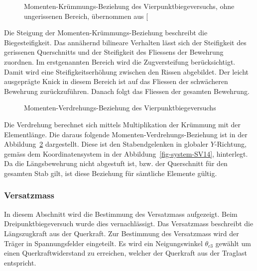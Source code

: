 \documentclass[
  11pt,
  letterpaper,
]{scrreprt}
\begin{document}
\begin{figure}[H]


\caption{\label{fig-mchi_sv14}Momenten-Krümmungs-Beziehung des
Vierpunktbiegeversuchs, ohne ungerissenen Bereich, übernommen aus
{[}\citeproc{ref-gitz_ansatze_2024}{1}{]}}

\end{figure}%

Die Steigung der Momenten-Krümmungs-Beziehung beschreibt die
Biegesteifigkeit. Das annähernd bilineare Verhalten lässt sich der
Steifigkeit des gerissenen Querschnitts und der Steifigkeit des
Fliessens der Bewehrung zuordnen. Im erstgenannten Bereich wird die
Zugversteifung berücksichtigt. Damit wird eine Steifigkeitserhöhung
zwischen den Rissen abgebildet. Der leicht ausgeprägte Knick in diesem
Bereich ist auf das Fliessen der schwächeren Bewehrung zurückzuführen.
Danach folgt das Fliessen der gesamten Bewehrung.

\begin{figure}[H]


\caption{\label{fig-mphi_sv14}Momenten-Verdrehungs-Beziehung des
Vierpunktbiegeversuchs}

\end{figure}%

Die Verdrehung berechnet sich mittels Multiplikation der Krümmung mit
der Elementlänge. Die daraus folgende Momenten-Verdrehungs-Beziehung ist
in der Abbildung~\ref{fig-mphi_sv14} dargestellt. Diese ist den
Stabendgelenken in globaler \(Y\)-Richtung, gemäss dem Koordinatensystem
in der Abbildung~\ref{fig-system-SV14}, hinterlegt. Da die
Längsbewehrung nicht abgestuft ist, bzw. der Querschnitt für den
gesamten Stab gilt, ist diese Beziehung für sämtliche Elemente gültig.

\subsubsection{Versatzmass}\label{versatzmass}

In diesem Abschnitt wird die Bestimmung des Versatzmass aufgezeigt. Beim
Dreipunktbiegeversuch wurde dies vernachlässigt. Das Versatzmass
beschreibt die Längszugkraft aus der Querkraft. Zur Bestimmung des
Versatzmass wird der Träger in Spannungsfelder eingeteilt. Es wird ein
Neigungswinkel \(\theta_{c3}\) gewählt um einen Querkraftwiderstand zu
erreichen, welcher der Querkraft aus der Traglast entspricht.
\end{document}
